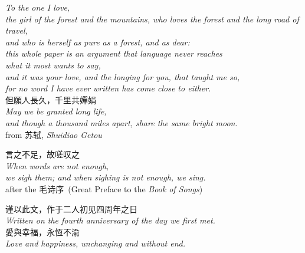 \thispagestyle{empty}
\null\vfill
\begin{center}
{\itshape\color{ink}
To the one I love,\\[0.4em]
the girl of the forest and the mountains, who loves the forest and the long road of travel,\\[0.25em]
and who is herself as pure as a forest, and as dear:\\[0.25em]
this whole paper is an argument that language never reaches\\[0.25em]
what it most wants to say,\\[0.25em]
and it was your love, and the longing for you, that taught me so,\\[0.25em]
for no word I have ever written has come close to either.\\}
\vspace{2.6em}
{\cjkfont\large\color{rosedeep} 但願人長久，千里共嬋娟}\\[0.8em]
{\itshape\small\color{rosedeep}
May we be granted long life,\\[0.18em]
and though a thousand miles apart, share the same bright moon.}\\[1.0em]
{\footnotesize\color{sage}from \cjkfont 苏轼\/{\normalfont, \textit{Shuidiao Getou}}}
\vspace{2.4em}

{\cjkfont\large\color{rosedeep} 言之不足，故嗟叹之}\\[0.8em]
{\itshape\small\color{rosedeep}
When words are not enough,\\[0.18em]
we sigh them; and when sighing is not enough, we sing.}\\[1.0em]
{\footnotesize\color{sage}after the \cjkfont 毛诗序\/{\normalfont\ (Great Preface to the \textit{Book of Songs})}}
\vspace{2.8em}

{\cjkfont\color{rosedeep} 谨以此文，作于二人初见四周年之日}\\[0.5em]
{\itshape\small\color{ink}
Written on the fourth anniversary of the day we first met.}\\[1.4em]
{\cjkfont\large\color{rosedeep} 愛與幸福，永恆不渝}\\[0.6em]
{\itshape\small\color{rosedeep}
Love and happiness, unchanging and without end.}
\end{center}
\vfill\null
\clearpage



